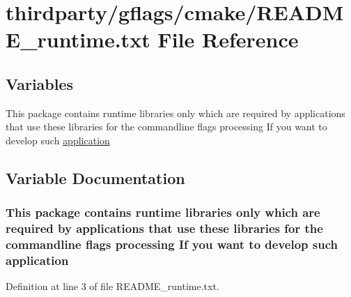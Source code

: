\hypertarget{README__runtime_8txt}{}\section{thirdparty/gflags/cmake/\+R\+E\+A\+D\+M\+E\+\_\+runtime.txt File Reference}
\label{README__runtime_8txt}
\subsection*{Variables}
\begin{DoxyCompactItemize}
\item 
This package contains runtime libraries only which are required by applications that use these libraries for the commandline flags processing If you want to develop such \hyperlink{README__runtime_8txt_a69b1952a76c902e0d4c17bc781a52d9a}{application}
\end{DoxyCompactItemize}


\subsection{Variable Documentation}
\subsubsection[{\texorpdfstring{application}{application}}]{\setlength{\rightskip}{0pt plus 5cm}This package contains runtime libraries only which are required by applications that use these libraries for the commandline flags processing If you want to develop such application}\hypertarget{README__runtime_8txt_a69b1952a76c902e0d4c17bc781a52d9a}{}\label{README__runtime_8txt_a69b1952a76c902e0d4c17bc781a52d9a}


Definition at line 3 of file R\+E\+A\+D\+M\+E\+\_\+runtime.\+txt.

